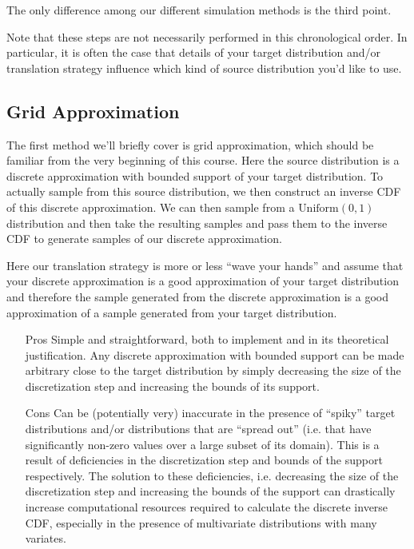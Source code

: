 \documentclass{article}
\begin{document}
The only difference among our different simulation methods is the third point.

Note that these steps are not necessarily performed in this chronological order.
In particular, it is often the case that details of your target distribution and/or translation strategy influence which kind of source distribution you'd like to use.

\subsection{Grid Approximation}

The first method we'll briefly cover is grid approximation, which should be familiar from the very beginning of this course.
Here the source distribution is a discrete approximation with bounded support of your target distribution.
To actually sample from this source distribution, we then construct an inverse CDF of this discrete approximation.
We can then sample from a $\text{Uniform}(0, 1)$ distribution and then take the resulting samples and pass them to the inverse CDF to generate samples of our discrete approximation.

Here our translation strategy is more or less ``wave your hands'' and assume that your discrete approximation is a good approximation of your target distribution and therefore the sample generated from the discrete approximation is a good approximation of a sample generated from your target distribution.

\begin{itemize}
	\item[Pros]
		Simple and straightforward, both to implement and in its theoretical justification.
		Any discrete approximation with bounded support can be made arbitrary close to the target distribution by simply decreasing the size of the discretization step and increasing the bounds of its support.
	\item[Cons]
		Can be (potentially very) inaccurate in the presence of ``spiky'' target distributions and/or distributions that are ``spread out'' (i.e. that have significantly non-zero values over a large subset of its domain).
		This is a result of deficiencies in the discretization step and bounds of the support respectively.
		The solution to these deficiencies, i.e. decreasing the size of the discretization step and increasing the bounds of the support can drastically increase computational resources required to calculate the discrete inverse CDF, especially in the presence of multivariate distributions with many variates.
\end{itemize}
\end{document}
